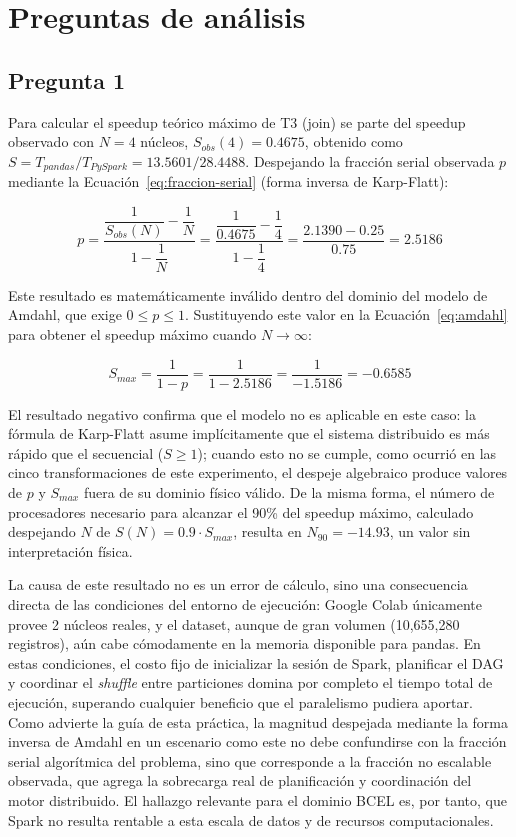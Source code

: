 \documentclass[11pt,a4paper]{article}
\begin{document}
\section{Preguntas de análisis}

\subsection*{Pregunta 1}
Para calcular el speedup teórico máximo de T3 (join) se parte del speedup
observado con $N=4$ núcleos, $S_{obs}(4) = 0.4675$, obtenido como
$S = T_{pandas}/T_{PySpark} = 13.5601/28.4488$. Despejando la fracción
serial observada $p$ mediante la Ecuación~\eqref{eq:fraccion-serial}
(forma inversa de Karp-Flatt):

\[
p = \frac{\dfrac{1}{S_{obs}(N)} - \dfrac{1}{N}}{1 - \dfrac{1}{N}}
  = \frac{\dfrac{1}{0.4675} - \dfrac{1}{4}}{1 - \dfrac{1}{4}}
  = \frac{2.1390 - 0.25}{0.75}
  = 2.5186
\]

Este resultado es matemáticamente inválido dentro del dominio del modelo de
Amdahl, que exige $0 \leq p \leq 1$. Sustituyendo este valor en la
Ecuación~\eqref{eq:amdahl} para obtener el speedup máximo cuando
$N \to \infty$:

\[
S_{max} = \frac{1}{1-p} = \frac{1}{1-2.5186} = \frac{1}{-1.5186} = -0.6585
\]

El resultado negativo confirma que el modelo no es aplicable en este caso: la
fórmula de Karp-Flatt asume implícitamente que el sistema distribuido es más
rápido que el secuencial ($S \geq 1$); cuando esto no se cumple, como ocurrió
en las cinco transformaciones de este experimento, el despeje algebraico
produce valores de $p$ y $S_{max}$ fuera de su dominio físico válido. De la
misma forma, el número de procesadores necesario para alcanzar el 90\% del
speedup máximo, calculado despejando $N$ de
$S(N) = 0.9 \cdot S_{max}$, resulta en $N_{90} = -14.93$, un valor sin
interpretación física.

La causa de este resultado no es un error de cálculo, sino una consecuencia
directa de las condiciones del entorno de ejecución: Google Colab únicamente
provee 2 núcleos reales, y el dataset, aunque de gran volumen
(10{,}655{,}280 registros), aún cabe cómodamente en la memoria disponible
para pandas. En estas condiciones, el costo fijo de inicializar la sesión de
Spark, planificar el DAG y coordinar el \textit{shuffle} entre particiones
domina por completo el tiempo total de ejecución, superando cualquier
beneficio que el paralelismo pudiera aportar. Como advierte la guía de esta
práctica, la magnitud despejada mediante la forma inversa de Amdahl en un
escenario como este no debe confundirse con la fracción serial algorítmica
del problema, sino que corresponde a la fracción no escalable observada, que
agrega la sobrecarga real de planificación y coordinación del motor
distribuido. El hallazgo relevante para el dominio BCEL es, por tanto, que
Spark no resulta rentable a esta escala de datos y de recursos
computacionales.
\end{document}
